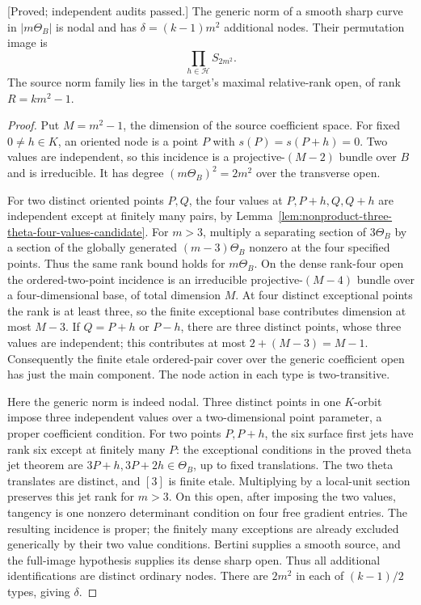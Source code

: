 \begin{lemma}
\label{lem:good-theta-uniform-node-product-candidate}
\textup{[Proved; independent audits passed.]}
The generic norm of a smooth sharp curve in $|m\Theta_B|$ is nodal
and has $\delta=(k-1)m^2$ additional nodes. Their permutation
image is
\[
                       \prod_{h\in\mathcal H}S_{2m^2}.
\]
The source norm family lies in the target's maximal relative-rank
open, of rank $R=km^2-1$.
\end{lemma}
\begin{proof}
Put $M=m^2-1$, the dimension of the source coefficient space.
For fixed $0\ne h\in K$, an oriented node is a point $P$ with
$s(P)=s(P+h)=0$. Two values are independent, so this incidence
is a projective-$(M-2)$ bundle over $B$ and is irreducible.
It has degree $(m\Theta_B)^2=2m^2$ over the transverse open.

For two distinct oriented points $P,Q$, the four values at
$P,P+h,Q,Q+h$ are independent except at finitely many pairs,
by Lemma~\ref{lem:nonproduct-three-theta-four-values-candidate}.
For $m>3$, multiply a separating section of $3\Theta_B$ by a
section of the globally generated $(m-3)\Theta_B$ nonzero at
the four specified points. Thus the same rank bound holds for
$m\Theta_B$. On the dense rank-four open the ordered-two-point
incidence is an irreducible projective-$(M-4)$ bundle over a
four-dimensional base, of total dimension $M$.
At four distinct exceptional points the rank is at least three,
so the finite exceptional base contributes dimension at most
$M-3$. If $Q=P+h$ or $P-h$, there are three distinct points, whose three values are independent; this contributes at most
$2+(M-3)=M-1$. Consequently the finite etale ordered-pair cover
over the generic coefficient open has just the main component.
The node action in each type is two-transitive.

Here the generic norm is indeed nodal. Three distinct points in
one $K$-orbit impose three independent values over a two-dimensional
point parameter, a proper coefficient condition. For two points
$P,P+h$, the six surface first jets have rank six except at
finitely many $P$: the exceptional conditions in the proved theta
jet theorem are $3P+h,3P+2h\in\Theta_B$, up to fixed translations.
The two theta translates are distinct, and $[3]$ is finite etale.
Multiplying by a local-unit section preserves this jet rank for
$m>3$. On this open, after imposing the two values, tangency is
one nonzero determinant condition on four free gradient entries.
The resulting incidence is proper; the finitely many exceptions
are already excluded generically by their two value conditions.
Bertini supplies a smooth source, and the full-image hypothesis
supplies its dense sharp open. Thus all additional identifications
are distinct ordinary nodes. There are $2m^2$ in each of
$(k-1)/2$ types, giving $\delta$.


\end{proof}
